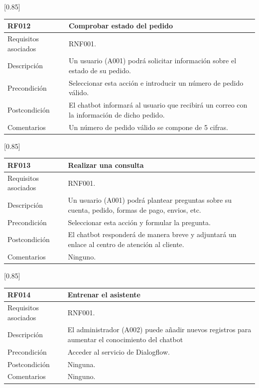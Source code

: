 \begin{table}[htbp]
  \centering
  \scalebox{0.85}[0.85] {
    \begin{tabular}{l p{32.145em}}
    \toprule
    \textbf{RF012} & \textbf{Comprobar estado del pedido} \\
    \midrule
    Requisitos asociados & RNF001. \\
    Descripción & Un usuario (A001) podrá solicitar información sobre el estado de su pedido. \\
    Precondición & Seleccionar esta acción e introducir un número de pedido válido. \\
    Postcondición & El chatbot informará al usuario que recibirá un correo con la información de dicho pedido. \\
    Comentarios & Un número de pedido válido se compone de 5 cifras. \\
    \midrule
    \end{tabular}%
  }
  \label{tab:rf012}
\end{table}%

\begin{table}[htbp]
  \centering
  \scalebox{0.85}[0.85] {
    \begin{tabular}{l p{32.145em}}
    \toprule
    \textbf{RF013} & \textbf{Realizar una consulta} \\
    \midrule
    Requisitos asociados & RNF001. \\
    Descripción & Un usuario (A001) podrá plantear preguntas sobre su cuenta, pedido, formas de pago, envios, etc. \\
    Precondición & Seleccionar esta acción y formular la pregunta. \\
    Postcondición & El chatbot responderá de manera breve y adjuntará un enlace al centro de atención al cliente. \\
    Comentarios & Ninguno. \\
    \midrule
    \end{tabular}%
  }
  \label{tab:rf013}
\end{table}%

\begin{table}[htbp]
  \centering
  \scalebox{0.85}[0.85] {
    \begin{tabular}{l p{32.145em}}
    \toprule
    \textbf{RF014} & \textbf{Entrenar el asistente} \\
    \midrule
    Requisitos asociados & RNF001. \\
    Descripción &  El administrador (A002) puede añadir nuevos registros para aumentar el conocimiento del chatbot\\
    Precondición & Acceder al servicio de Dialogflow. \\
    Postcondición & Ninguna. \\
    Comentarios & Ninguno. \\
    \midrule
    \end{tabular}%
  }
  \label{tab:rf014}
\end{table}%


